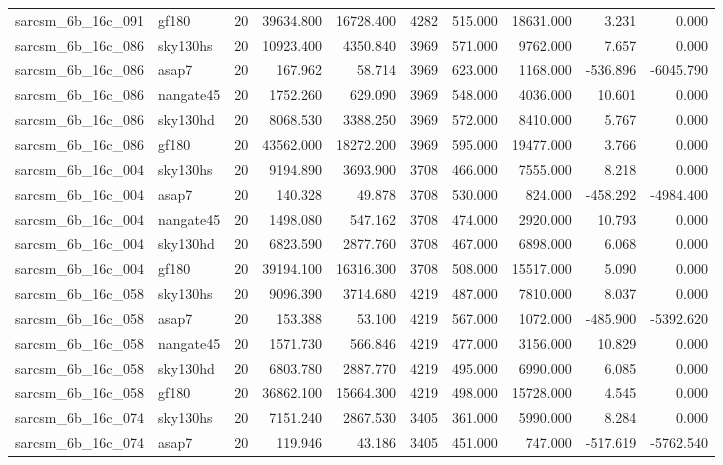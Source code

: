 \begin{longtable}{llrrrrrrrr}
sarcsm\_6b\_16c\_091 & gf180 & 20 & 39634.800 & 16728.400 & 4282 & 515.000 & 18631.000 & 3.231 & 0.000 \\
sarcsm\_6b\_16c\_086 & sky130hs & 20 & 10923.400 & 4350.840 & 3969 & 571.000 & 9762.000 & 7.657 & 0.000 \\
sarcsm\_6b\_16c\_086 & asap7 & 20 & 167.962 & 58.714 & 3969 & 623.000 & 1168.000 & -536.896 & -6045.790 \\
sarcsm\_6b\_16c\_086 & nangate45 & 20 & 1752.260 & 629.090 & 3969 & 548.000 & 4036.000 & 10.601 & 0.000 \\
sarcsm\_6b\_16c\_086 & sky130hd & 20 & 8068.530 & 3388.250 & 3969 & 572.000 & 8410.000 & 5.767 & 0.000 \\
sarcsm\_6b\_16c\_086 & gf180 & 20 & 43562.000 & 18272.200 & 3969 & 595.000 & 19477.000 & 3.766 & 0.000 \\
sarcsm\_6b\_16c\_004 & sky130hs & 20 & 9194.890 & 3693.900 & 3708 & 466.000 & 7555.000 & 8.218 & 0.000 \\
sarcsm\_6b\_16c\_004 & asap7 & 20 & 140.328 & 49.878 & 3708 & 530.000 & 824.000 & -458.292 & -4984.400 \\
sarcsm\_6b\_16c\_004 & nangate45 & 20 & 1498.080 & 547.162 & 3708 & 474.000 & 2920.000 & 10.793 & 0.000 \\
sarcsm\_6b\_16c\_004 & sky130hd & 20 & 6823.590 & 2877.760 & 3708 & 467.000 & 6898.000 & 6.068 & 0.000 \\
sarcsm\_6b\_16c\_004 & gf180 & 20 & 39194.100 & 16316.300 & 3708 & 508.000 & 15517.000 & 5.090 & 0.000 \\
sarcsm\_6b\_16c\_058 & sky130hs & 20 & 9096.390 & 3714.680 & 4219 & 487.000 & 7810.000 & 8.037 & 0.000 \\
sarcsm\_6b\_16c\_058 & asap7 & 20 & 153.388 & 53.100 & 4219 & 567.000 & 1072.000 & -485.900 & -5392.620 \\
sarcsm\_6b\_16c\_058 & nangate45 & 20 & 1571.730 & 566.846 & 4219 & 477.000 & 3156.000 & 10.829 & 0.000 \\
sarcsm\_6b\_16c\_058 & sky130hd & 20 & 6803.780 & 2887.770 & 4219 & 495.000 & 6990.000 & 6.085 & 0.000 \\
sarcsm\_6b\_16c\_058 & gf180 & 20 & 36862.100 & 15664.300 & 4219 & 498.000 & 15728.000 & 4.545 & 0.000 \\
sarcsm\_6b\_16c\_074 & sky130hs & 20 & 7151.240 & 2867.530 & 3405 & 361.000 & 5990.000 & 8.284 & 0.000 \\
sarcsm\_6b\_16c\_074 & asap7 & 20 & 119.946 & 43.186 & 3405 & 451.000 & 747.000 & -517.619 & -5762.540 \\

\end{longtable}
